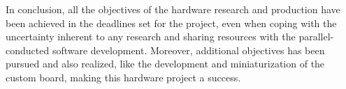 


		In conclusion, all the objectives of the hardware research and production have been achieved in the deadlines set for the project, even when coping with the uncertainty inherent to any research and sharing resources with the parallel-conducted software development. Moreover, additional objectives has been pursued and also realized, like the development and miniaturization of the custom board, making this hardware project a success.
		
		